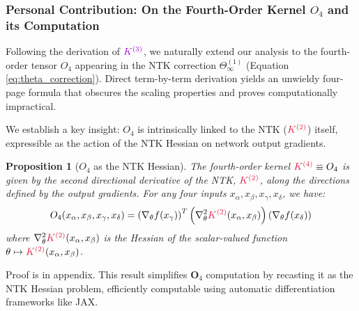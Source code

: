 \documentclass[a4paper]{article}
\theoremstyle{plain}
\newtheorem{proposition}[theorem]{Proposition}
\theoremstyle{definition}
\theoremstyle{remark}
\begin{document}
\subsubsection{Personal Contribution: On the Fourth-Order Kernel $O_4$ and its Computation}

Following the derivation of $\textcolor{k3color}{K^{(3)}}$, we naturally extend our analysis to the fourth-order tensor $O_4$ appearing in the NTK correction $\Theta^{(1)}_\infty$ (Equation \ref{eq:theta_correction}). Direct term-by-term derivation yields an unwieldy four-page formula that obscures the scaling properties and proves computationally impractical.

We establish a key insight: $O_4$ is intrinsically linked to the NTK ($\textcolor{kernelcolor}{\textcolor{kernelcolor}{K}^{(2)}}$) itself, expressible as the action of the NTK Hessian on network output gradients.
\begin{tcolorbox}[colback=blue!10,colframe=blue!60!black,title={\textbf{🔍 PERSONAL CONTRIBUTION: Novel Characterization of $O_4$}},enhanced,drop shadow]
\begin{proposition}[$O_4$ as the NTK Hessian]
The fourth-order kernel $\textcolor{kernelcolor}{\textcolor{kernelcolor}{K}^{(4)}} \equiv O_4$ is given by the second directional derivative of the NTK, $\textcolor{kernelcolor}{\textcolor{kernelcolor}{K}^{(2)}}$, along the directions defined by the output gradients. For any four inputs $x_\alpha, x_\beta, x_\gamma, x_\delta$, we have:
\begin{equation}
\label{eq:hessian_ntk_k4}
O_4(x_\alpha, x_\beta, x_\gamma, x_\delta) = \left( \nabla_\theta f(x_\gamma) \right)^T \left( \nabla^2_\theta \textcolor{kernelcolor}{\textcolor{kernelcolor}{K}^{(2)}}(x_\alpha, x_\beta) \right) \left( \nabla_\theta f(x_\delta) \right)
\end{equation}
where $\nabla^2_\theta \textcolor{kernelcolor}{\textcolor{kernelcolor}{K}^{(2)}}(x_\alpha, x_\beta)$ is the Hessian of the scalar-valued function $\theta \mapsto \textcolor{kernelcolor}{\textcolor{kernelcolor}{K}^{(2)}}(x_\alpha, x_\beta)$.
\end{proposition}
\end{tcolorbox}
Proof is in appendix. 
This result simplifies $\mathbf{O}_4$ computation by recasting it as the NTK Hessian problem, efficiently computable using automatic differentiation frameworks like JAX.
\end{document}

